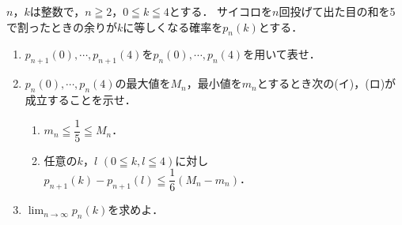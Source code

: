 \documentclass[../../main.tex]{subfiles}
\begin{document}
$n$，$k$は整数で，$n\geqq2$，$0\leqq k \leqq4$とする．
サイコロを$n$回投げて出た目の和を5で割ったときの余りが$k$に等しくなる確率を$p_n(k)$とする．
\begin{enumerate}
  \item $p_{n+1}(0),\cdots,p_{n+1}(4)$を$p_n(0),\cdots,p_n(4)$を用いて表せ．
  \item $p_n(0),\cdots,p_n(4)$の最大値を$M_n$，最小値を$m_n$とするとき次の(イ)，(ロ)が成立することを示せ．
    \begin{enumerate}
      \item[(イ)] $\displaystyle m_n \leqq \dfrac{1}{5} \leqq M_n$．
      \item[(ロ)] 任意の$k$，$l$ $(0 \leqq k,l \leqq 4)$に対し
        $\displaystyle p_{n+1}(k)-p_{n+1}(l)\leqq\dfrac{1}{6}(M_n-m_n)$．
    \end{enumerate}
  \item $\displaystyle\lim_{n\to\infty}p_n(k)$を求めよ．
\end{enumerate}
\end{document}
